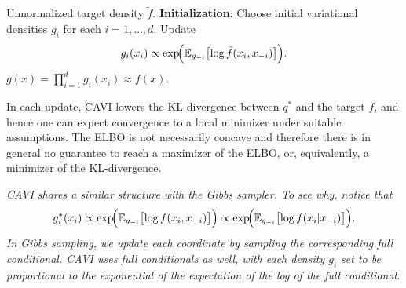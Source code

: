 \begin{algorithm}[H]
  \caption{Coordinate Ascent Variational Inference (CAVI)}
  \label{alg:10.1}
  \begin{algorithmic}[1]
    \Require Unnormalized target density $\tilde{f}$.
    \State \textbf{Initialization}: Choose initial variational densities $g_i$ for each $i = 1, \ldots, d$.
        \State Update
        \[
          g_i(x_i) \propto \exp\!\Bigl(\mathbb{E}_{g_{-i}}\bigl[\log \tilde{f}(x_i, x_{-i})\bigr]\Bigr).
        \]
      \EndFor
    \EndWhile
    \Ensure $g(x) = \prod_{i=1}^{d} g_i(x_i) \approx f(x)$.
  \end{algorithmic}
\end{algorithm}

In each update, CAVI lowers the KL-divergence between $q^*$ and the target $f$, and hence one can
expect convergence to a local minimizer under suitable assumptions. The ELBO is not necessarily
concave and therefore there is in general no guarantee to reach a maximizer of the ELBO, or,
equivalently, a minimizer of the KL-divergence.

\medskip
\noindent{}
\medskip

\begin{remark}
  \label{rem:10.8}
  \textit{CAVI shares a similar structure with the Gibbs sampler. To see why, notice that}
  \[
    g_i^*(x_i) \propto \exp\!\Bigl(\mathbb{E}_{g_{-i}}\bigl[\log f(x_i, x_{-i})\bigr]\Bigr)
    \propto \exp\!\Bigl(\mathbb{E}_{g_{-i}}\bigl[\log f(x_i | x_{-i})\bigr]\Bigr).
  \]
  \textit{In Gibbs sampling, we update each coordinate by sampling the corresponding full
  conditional. CAVI uses full conditionals as well, with each density $g_i$ set to be proportional
  to the exponential of the expectation of the log of the full conditional.}
\end{remark}
